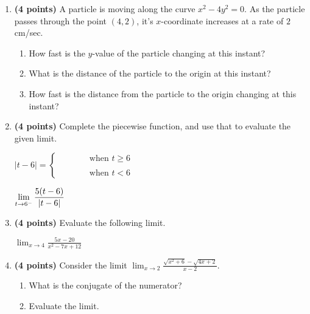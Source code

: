 \documentclass[12pt]{amsart}
\begin{document}
\begin{enumerate}
\vspace{2cm}
\newpage\def \b{4}\def \x{4}\def \y{2}\def \xchange{2}\def \ratrhs{8}\def \cirrhs{32}\def \hyprhs{0}\def \compy{4y^{2}}\def \ychangenum{4}\def \dist{20}\def \fracrat{12}\def \fraccirc{12}\def \frachyp{20}
\item {\bf (4 points)} 
 A particle is moving along the curve $x^2 - \compy = \hyprhs$. As the particle passes through the point $(\x,\y)$, it's $x$-coordinate increases at a rate of $\xchange$cm/sec. \begin{enumerate}
\item How fast is the $y$-value of the particle changing at this instant? \vfill
\item What is the distance of the particle to the origin at this instant? \vfill
\item How fast is the distance from the particle to the origin changing at this instant? \vfill
\end{enumerate}

\newpage\def \a{6}\def \k{5}\def \abstop{0}\def \ktop{1}
\item {\bf (4 points)} 
 Complete the piecewise function, and use that to evaluate the given limit.

\vspace{.5cm}

$|t- \a| = \begin{cases} \hspace{1cm} & \text{ when } t \geq \a \\ & \\ \hspace{1cm} & \text{ when } t < \a \end{cases}$

\vspace{.5cm}

$\displaystyle \lim_{t \rightarrow \a^-} \frac{\ifthenelse{\ktop=1}{\k}{}\ifthenelse{\abstop=1}{|t-\a|}{(t-\a)}}{\ifthenelse{\ktop=0}{\k}{}\ifthenelse{\abstop=0}{|t-\a|}{(t-\a)}}$

\vfill 
\def \a{4}\def \b{3}\def \k{5}\def \fancyp{x^{2}-7x^{}+12}\def \simplep{5x^{}-20}\def \fancyreduced{1}\def \niceanstop{\frac{1}{5}}\def \niceansbottom{5}
\item {\bf (4 points)} 
 Evaluate the following limit. 

$\displaystyle \lim_{x\rightarrow \a} \frac{\simplep}{\fancyp}$

\vfill 
\newpage\def \a{2}\def \b{2}\def \ab{4}\def \c{6}\def \amb{0}\def \ansroot{10}\def \firstroot{x^{2}+6}\def \secondroot{4x^{}+2}\def \porm{1}
\item {\bf (4 points)} 
 Consider the limit $\displaystyle \lim_{x \rightarrow \a} \frac{\sqrt{\firstroot} - \sqrt{\secondroot}}{x-\a}$. \begin{enumerate}
\item What is the conjugate of the numerator? \vspace{3cm}
\item Evaluate the limit.
\end{enumerate}


\end{enumerate}
\end{document}
